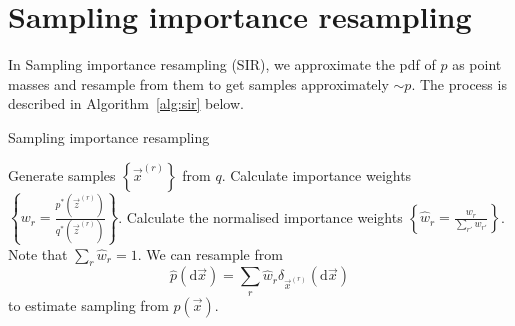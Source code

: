 \section{Sampling importance resampling}
\label{section:sir}
In Sampling importance resampling (SIR), we approximate the pdf of $p$ as point masses and resample from them to get samples approximately $\sim p$. The process is described in Algorithm~\ref{alg:sir} below.
\begin{algorithm}
\caption{Sampling importance resampling}\label{alg:sir}
    \begin{algorithmic}[1]
        \State Generate samples $\left\{\vec x^{(r)}\right\}$ from $q$.
        \State Calculate importance weights $\left\{w_r = \frac{p^\ast(\vec z^{(r)})}{q^\ast(\vec z^{(r)})}\right\}$.
        \State Calculate the normalised importance weights $\left\{\hat w_r = \frac{w_r}{\sum_{r'} w_{r'}}\right\}$. Note that $\sum_r \hat w_r  = 1$.
        \State We can resample from
            \begin{equation}
                \hat p(\mathrm d \vec x) = \sum_r \hat w_r \delta_{\vec x^{(r)}}(\mathrm d\vec x)
            \end{equation}
            to estimate sampling from $p(\vec x)$.
    \end{algorithmic}
\end{algorithm}


